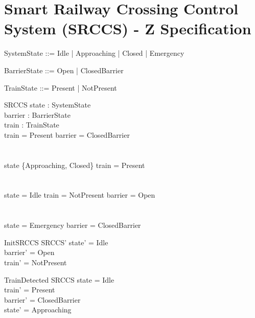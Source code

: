 \documentclass{article}
\begin{document}
\section*{Smart Railway Crossing Control System (SRCCS) - Z Specification}

\begin{zed}
  SystemState ::= Idle | Approaching | Closed | Emergency
\end{zed}

\begin{zed}
  BarrierState ::= Open | ClosedBarrier
\end{zed}

\begin{zed}
  TrainState ::= Present | NotPresent
\end{zed}

\begin{schema}{SRCCS}
  state : SystemState \\
  barrier : BarrierState \\
  train : TrainState
\where
   \\
  train = Present \implies barrier = ClosedBarrier \\
  \\
   \\
  state \in \{Approaching, Closed\} \implies train = Present \\
  \\
   \\
  state = Idle \implies train = NotPresent \land barrier = Open \\
  \\
   \\
  state = Emergency \implies barrier = ClosedBarrier
\end{schema}

\begin{schema}{InitSRCCS}
  SRCCS'
\where
  state' = Idle \\
  barrier' = Open \\
  train' = NotPresent
\end{schema}

\begin{schema}{TrainDetected}
  \Delta SRCCS
\where
  state = Idle \\
  train' = Present \\
  barrier' = ClosedBarrier \\
  state' = Approaching
\end{schema}
\end{document}
